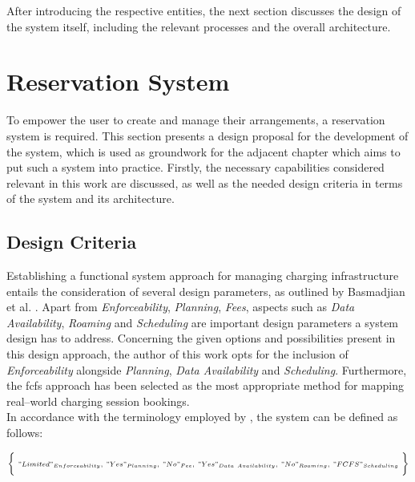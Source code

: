 \noindent After introducing the respective entities, the next section discusses the design of the system itself, including the relevant processes and the overall architecture. 

\newpage

\section{Reservation System}
\label{ch:Design:sec:Reservation System}

To empower the user to create and manage their arrangements, a reservation system is required. This section presents a design proposal for the development of the system, which is used as groundwork for the adjacent chapter which aims to put such a system into practice. Firstly, the necessary capabilities considered relevant in this work are discussed, as well as the needed design criteria in terms of the system and its architecture.

\subsection{Design Criteria}
\label{ch:Design:sec:Reservation System:ssec:Design Criteria}

Establishing a functional system approach for managing charging infrastructure entails the consideration of several design parameters, as outlined by Basmadjian et al. \cite{basmadjian_reference_2020}. Apart from \textit{Enforceability}, \textit{Planning}, \textit{Fees}, aspects such as \textit{Data Availability}, \textit{Roaming} and \textit{Scheduling} are important design parameters a system design has to address.
Concerning the given options and possibilities present in this design approach, the author of this work opts for the inclusion of \textit{Enforceability} alongside \textit{Planning}, \textit{Data Availability} and \textit{Scheduling}. 
Furthermore, the \acrshort{fcfs} approach has been selected as the most appropriate method for mapping real--world charging session bookings.\\
\noindent In accordance with the terminology employed by \cite{basmadjian_reference_2020}, the system can be defined as follows:

\begin{eqnarray*}
\scriptstyle \biggl\{\ "Limited"_{Enforceability},\ "Yes"_{Planning},\ "No"_{Fee},\ "Yes"_{Data\ Availability},\ "No"_{Roaming},\ "FCFS"_{Scheduling}\ \biggr\}
\end{eqnarray*}

